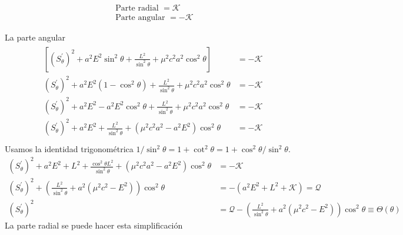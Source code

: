 $$
\begin{array}{c}
\text { Parte radial }=\mathcal{K} \\
\text { Parte angular }=-\mathcal{K}
\end{array}
$$

La parte angular
\begin{align}
   \begin{aligned}
     \left[\left(S_\theta^{\prime}\right)^2+a^2 E^2 \sin ^2 \theta+\frac{L^2}{\sin ^2 \theta}+\mu^2 c^2 a^2 \cos ^2 \theta\right] &= -\mathcal{K}\\
    \left(S_\theta^{\prime}\right)^2+a^2 E^2 (1- \cos^2 \theta)+\frac{L^2}{\sin ^2 \theta}+\mu^2 c^2 a^2 \cos ^2 \theta &= -\mathcal{K}\\
    \left(S_\theta^{\prime}\right)^2+a^2 E^2 - a^2 E^2 \cos^2 \theta+\frac{L^2}{\sin ^2 \theta}+\mu^2 c^2 a^2 \cos ^2 \theta &= -\mathcal{K}\\
    \left(S_\theta^{\prime}\right)^2+a^2 E^2+\frac{L^2}{\sin ^2 \theta}+(\mu^2 c^2 a^2 - a^2 E^2) \cos ^2 \theta &= -\mathcal{K}\\
   \end{aligned}
\end{align}
Usamos la identidad trigonométrica $1 / \sin ^2 \theta=1+\cot ^2 \theta=1+\cos ^2 \theta / \sin ^2 \theta$.
\begin{equation}
    \begin{aligned}
        \left(S_\theta^{\prime}\right)^2+a^2 E^2+L^2+\frac{\cos^2 \theta L^2}{\sin ^2 \theta}+(\mu^2 c^2 a^2 - a^2 E^2) \cos ^2 \theta &= -\mathcal{K}\\
        \left(S_\theta^{\prime}\right)^2+\left(\frac{ L^2}{\sin ^2 \theta}+a^2(\mu^2 c^2  -  E^2) \right)\cos ^2 \theta &= -(a^2 E^2+L^2+\mathcal{K}) =\mathcal{Q}\\
\left(S_\theta^{\prime}\right)^2 &= \mathcal{Q} - \left(\frac{ L^2}{\sin ^2 \theta}+a^2(\mu^2 c^2  -  E^2) \right)\cos ^2 \theta \equiv \Theta(\theta )
    \end{aligned}
\end{equation}
La parte radial se puede hacer esta simplificación


